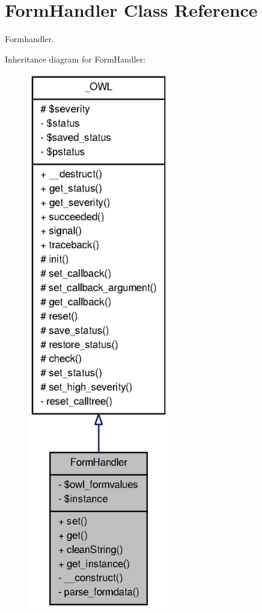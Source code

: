 \section{FormHandler Class Reference}
\label{classFormHandler}


Formhandler.  




Inheritance diagram for FormHandler:\nopagebreak
\begin{figure}[H]
\begin{center}
\leavevmode
\includegraphics[width=174pt]{classFormHandler__inherit__graph}
\end{center}
\end{figure}


